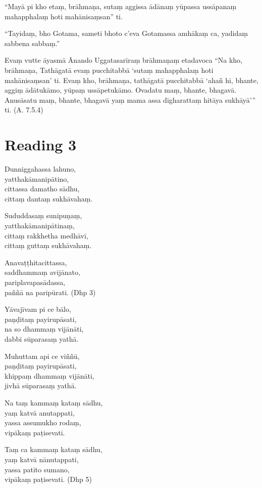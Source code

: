 “Mayā pi kho etaṃ, brāhmaṇa, sutaṃ aggissa ādānaṃ yūpassa ussāpanaṃ mahapphalaṃ hoti mahānisaṃsan” ti.

“Tayidaṃ, bho Gotama, sameti bhoto c’eva Gotamassa amhākaṃ ca, yadidaṃ sabbena sabbaṃ.”

Evaṃ vutte āyasmā Ānando Uggatasarīraṃ brāhmaṇaṃ etadavoca “Na kho, brāhmaṇa, Tathāgatā evaṃ pucchitabbā ‘sutaṃ mahapphalaṃ hoti mahānisaṃsan’ ti. Evaṃ kho, brāhmaṇa, tathāgatā pucchitabbā ‘ahañ hi, bhante, aggiṃ ādātukāmo, yūpaṃ ussāpetukāmo. Ovadatu maṃ, bhante, bhagavā. Anusāsatu maṃ, bhante, bhagavā yaṃ mama assa dīgharattaṃ hitāya sukhāyā’” ti. \hfill(A. 7.5.4)

\section*{Reading 3}

Dunniggahassa lahuno,\\
yatthakāmanipātino,\\
cittassa damatho sādhu,\\
cittaṃ dantaṃ sukhāvahaṃ.

Sududdasaṃ sunipuṇaṃ,\\
yatthakāmanipātinaṃ,\\
cittaṃ rakkhetha medhāvī,\\
cittaṃ guttaṃ sukhāvahaṃ.

Anavaṭṭhitacittassa,\\
saddhammaṃ avijānato,\\
pariplavapasādassa,\\
paññā na paripūrati. \hfill(Dhp 3)

Yāvajīvam pi ce bālo,\\
paṇḍitaṃ payirupāsati,\\
na so dhammaṃ vijānāti,\\
dabbī sūparasaṃ yathā.

Muhuttam api ce viññū,\\
paṇḍitaṃ payirupāsati,\\
khippaṃ dhammaṃ vijānāti,\\
jivhā sūparasaṃ yathā.

Na taṃ kammaṃ kataṃ sādhu,\\
yaṃ katvā anutappati,\\
yassa assumukho rodaṃ,\\
vipākaṃ paṭisevati.

Taṃ ca kammaṃ kataṃ sādhu,\\
yaṃ katvā nānutappati,\\
yassa patīto sumano,\\
vipākaṃ paṭisevati. \hfill(Dhp 5)


